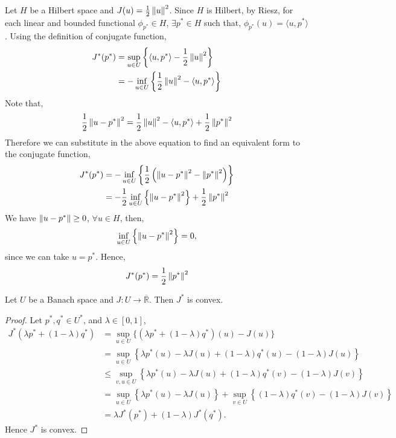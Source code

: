 \begin{example}
	Let $H$ be a Hilbert space and $J(u)=\frac{1}{2} \left\lVert u\right\rVert^2$.
	Since $H$ is Hilbert, by Riesz, for each linear and bounded functional $\phi_{p^{*}} \in H$, $\exists p^* \in H$ such that, $\phi_{p^{*}}(u)=\langle u,p^*\rangle$. Using the definition of conjugate function,
	\begin{align*}
	J^*(p^*) &= \sup_{u \in U} \left\lbrace\langle u, p^*\rangle -\frac{1}{2} \left\lVert u\right\rVert^2\right\rbrace \\
	&= -\inf_{u \in U} \left\lbrace \frac{1}{2} \left\lVert u\right\rVert^2-\langle u, p^*\rangle \right\rbrace
	\end{align*}
Note that,
\[
	\frac{1}{2}\left\lVert u-p^*\right\rVert^2=\frac{1}{2}\left\lVert u\right\rVert^2-\langle u ,p^*\rangle + \frac{1}{2}\left\lVert p^*\right\rVert^2 
\]
Therefore we can substitute in the above equation to find an equivalent form to the conjugate function,
\begin{align*}
J^*(p^*) &=-\inf_{u \in U} \left\lbrace \frac{1}{2} \left(\left\lVert u-p^*\right\rVert^2 - \left\lVert p^*\right\rVert^2\right) \right\rbrace \\
&=-\frac{1}{2} \inf_{u \in U} \left\lbrace  \left\lVert u-p^*\right\rVert^2\right\rbrace +\frac{1}{2} \left\lVert p^*\right\rVert^2
\end{align*}
We have $\left\lVert u-p^*\right\rVert \geq 0$, $\forall u \in H$, then,
\[
\inf_{u \in U} \left\lbrace  \left\lVert u-p^*\right\rVert^2\right\rbrace=0,
\]
since we can take $u=p^*$. Hence,
\begin{equation}
	J^*(p^*)=\frac{1}{2}\left\lVert p^*\right\rVert^2
\end{equation}
\end{example}
\begin{theorem}
	Let $U$ be a Banach space and $J:U\rightarrow \overline{\mathbb{R}}$. Then $J^*$ is convex.
	\begin{proof}
		Let $p^*, q^* \in U^*$, and $\lambda \in [0,1]$,
		\begin{align}
			J^*(\lambda p^* +(1-\lambda)q^*) &=\sup_{u\in U}\lbrace (\lambda p^* +(1-\lambda)q^*)(u)-J(u) \rbrace \\
										 &= \sup_{u \in U} \left\lbrace  \lambda p^*(u)	- \lambda J(u) +(1-\lambda)q^* (u)-(1-\lambda)J(u)\right\rbrace\\
										 &\leq \sup_{v,u\in U} \left\lbrace  \lambda p^*(u)	- \lambda J(u) +(1-\lambda)q^* (v)-(1-\lambda)J(v)\right\rbrace \\
										 &=\sup_{u\in U} \left\lbrace  \lambda p^*(u)	- \lambda J(u)\right\rbrace +\sup_{v \in U}\left\lbrace(1-\lambda)q^* (v)-(1-\lambda)J(v)\right\rbrace \\
										 &=\lambda J^*(p^*)+(1-\lambda) J^*(q^*).
		\end{align}	
		Hence $J^*$ is convex.
	\end{proof}
\end{theorem}